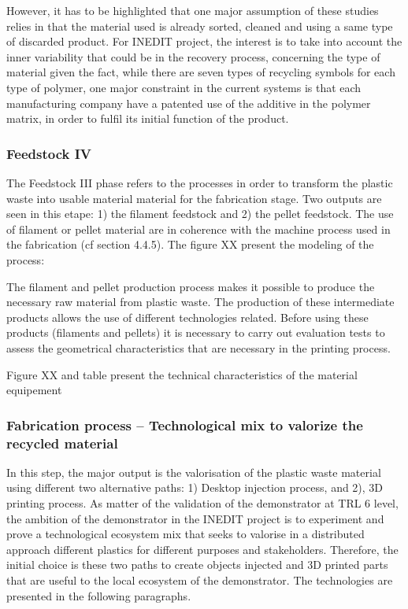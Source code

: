 \documentclass[
  11pt,
]{article}
\begin{document}
However, it has to be highlighted that one major assumption of these
studies relies in that the material used is already sorted, cleaned and
using a same type of discarded product. For INEDIT project, the interest
is to take into account the inner variability that could be in the
recovery process, concerning the type of material given the fact, while
there are seven types of recycling symbols for each type of polymer, one
major constraint in the current systems is that each manufacturing
company have a patented use of the additive in the polymer matrix, in
order to fulfil its initial function of the product.

\hypertarget{feedstock-iv}{%
\subsubsection{Feedstock IV}\label{feedstock-iv}}

The Feedstock III phase refers to the processes in order to transform
the plastic waste into usable material material for the fabrication
stage. Two outputs are seen in this etape: 1) the filament feedstock and
2) the pellet feedstock. The use of filament or pellet material are in
coherence with the machine process used in the fabrication (cf section
4.4.5). The figure XX present the modeling of the process:

The filament and pellet production process makes it possible to produce
the necessary raw material from plastic waste. The production of these
intermediate products allows the use of different technologies related.
Before using these products (filaments and pellets) it is necessary to
carry out evaluation tests to assess the geometrical characteristics
that are necessary in the printing process.

Figure XX and table present the technical characteristics of the
material equipement

\hypertarget{fabrication-process-technological-mix-to-valorize-the-recycled-material}{%
\subsubsection{Fabrication process -- Technological mix to valorize the
recycled
material}\label{fabrication-process-technological-mix-to-valorize-the-recycled-material}}

In this step, the major output is the valorisation of the plastic waste
material using different two alternative paths: 1) Desktop injection
process, and 2), 3D printing process. As matter of the validation of the
demonstrator at TRL 6 level, the ambition of the demonstrator in the
INEDIT project is to experiment and prove a technological ecosystem mix
that seeks to valorise in a distributed approach different plastics for
different purposes and stakeholders. Therefore, the initial choice is
these two paths to create objects injected and 3D printed parts that are
useful to the local ecosystem of the demonstrator. The technologies are
presented in the following paragraphs.
\end{document}
